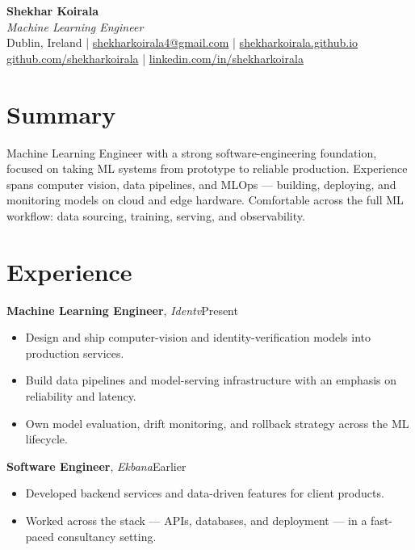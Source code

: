 \documentclass[a4paper,10pt]{article}
\newcommand{\role}[3]{%
  \noindent\textbf{#1}, \textit{#2}\hfill{\small #3}\par
}
\begin{document}
\begin{center}
  {\LARGE\bfseries Shekhar Koirala}\\[2pt]
  {\large\itshape Machine Learning Engineer}\\[4pt]
  {\small Dublin, Ireland \quad|\quad
   \href{mailto:shekharkoirala4@gmail.com}{shekharkoirala4@gmail.com} \quad|\quad
   \href{https://shekharkoirala.github.io}{shekharkoirala.github.io}}\\[1pt]
  {\small \href{https://github.com/shekharkoirala}{github.com/shekharkoirala} \quad|\quad
   \href{https://linkedin.com/in/shekharkoirala}{linkedin.com/in/shekharkoirala}}
\end{center}

\section{Summary}
Machine Learning Engineer with a strong software-engineering foundation, focused on
taking ML systems from prototype to reliable production. Experience spans computer
vision, data pipelines, and MLOps --- building, deploying, and monitoring models on
cloud and edge hardware. Comfortable across the full ML workflow: data sourcing,
training, serving, and observability.

\section{Experience}
\role{Machine Learning Engineer}{Identv}{Present}
\begin{itemize}
  \item Design and ship computer-vision and identity-verification models into production services.
  \item Build data pipelines and model-serving infrastructure with an emphasis on reliability and latency.
  \item Own model evaluation, drift monitoring, and rollback strategy across the ML lifecycle.
\end{itemize}
\vspace{4pt}
\role{Software Engineer}{Ekbana}{Earlier}
\begin{itemize}
  \item Developed backend services and data-driven features for client products.
  \item Worked across the stack --- APIs, databases, and deployment --- in a fast-paced consultancy setting.
\end{itemize}
\end{document}
